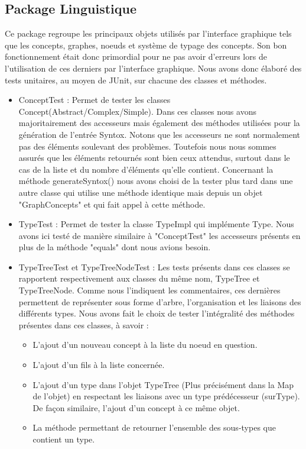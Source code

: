 \documentclass[12pt]{report}
\begin{document}
\subsection{Package Linguistique}
Ce package regroupe les principaux objets utilisés par l'interface graphique tels que les concepts, graphes, noeuds et système de typage des concepts. Son bon fonctionnement était donc primordial pour ne pas avoir d'erreurs lors de l'utilisation de ces derniers par l'interface graphique. Nous avons donc élaboré des tests unitaires, au moyen de JUnit, sur chacune des classes et méthodes. 
\begin{itemize}	
\item ConceptTest : Permet de tester les classes Concept(Abstract/Complex/Simple). Dans ces classes nous avons majoritairement des accesseurs mais également des méthodes utilisées pour la génération de l'entrée Syntox. Notons que les accesseurs ne sont normalement pas des éléments soulevant des problèmes. Toutefois nous nous sommes assurés que les éléments retournés sont bien ceux attendus, surtout dans le cas de la liste et du nombre d'éléments qu'elle contient.
Concernant la méthode generateSyntox() nous avons choisi de la tester plus tard dans une autre classe qui utilise une méthode identique mais depuis un objet "GraphConcepts" et qui fait appel à cette méthode.
\item TypeTest : Permet de tester la classe TypeImpl qui implémente Type. Nous avons ici testé de manière similaire à "ConceptTest" les accesseurs présents en plus de la méthode "equals" dont nous avions besoin. 
\item TypeTreeTest et TypeTreeNodeTest : Les tests présents dans ces classes se rapportent respectivement aux classes du même nom, TypeTree et TypeTreeNode. Comme nous l'indiquent les commentaires, ces dernières permettent de représenter sous forme d'arbre, l'organisation et les liaisons des différents types.
Nous avons fait le choix de tester l'intégralité des méthodes présentes dans ces classes, à savoir :
	\begin{itemize}
	\item L'ajout d'un nouveau concept à la liste du noeud en question. 
	\item L'ajout d'un fils à la liste concernée.
	\item L'ajout d'un type dans l'objet TypeTree (Plus précisément dans la Map de l'objet) en respectant les liaisons avec un type prédécesseur (surType). De façon similaire, l'ajout d'un concept à ce même objet.
	\item La méthode permettant de retourner l'ensemble des sous-types que contient un type. 

\end{itemize}
\end{itemize}
\end{document}
